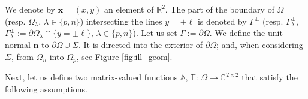 \documentclass[report]{elsarticle}
\newtheorem{assumption}[theorem]{Assumption}
\numberwithin{theorem}{section}
\renewcommand{\vec}[1]{\mathbf{#1}}
\begin{document}
We denote by $\vec{x}=(x,y)$ an element of $\mathbb{R}^2$. 
The part of the boundary of $\Omega$ (resp. $\Omega_{\lambda}, \, \lambda\in\{p,n\}$) intersecting the lines $y=\pm\ell$ is denoted by $\Gamma^{\pm}$ (resp. $\Gamma^{\pm}_{\lambda}$, $\Gamma^{\pm}_{\lambda}:=\partial\Omega_{\lambda}\cap \{y=\pm\ell\}, \, \lambda\in\{p,n\}$). Let us set $\Gamma:=\partial\Omega$. We define the unit normal $\vec{n}$ to  $\partial\Omega\cup\Sigma$. It is directed into the exterior of $\partial\Omega$; and, when considering $\Sigma$, from $\Omega_n$ into $\Omega_p$, see Figure \ref{fig:ill_geom}. 


Next, let us define two matrix-valued functions $\mathbb{A}, \, \mathbb{T}: \, \overline{\Omega}\rightarrow \mathbb{C}^{2\times2}$ that satisfy the following assumptions.
\end{document}
